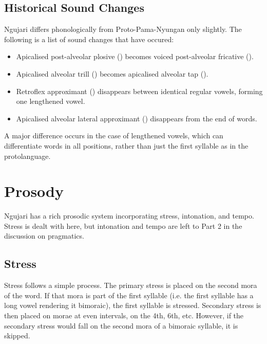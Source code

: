 %
%

\subsection{Historical Sound Changes}

Ngujari differs phonologically from Proto-Pama-Nyungan only slightly. The
following is a list of sound changes that have occured:

\begin{itemize}
\item Apicalised post-alveolar plosive () becomes
  voiced post-alveolar fricative ().
\item Apicalised alveolar trill (\textipa{\|]r}) becomes apicalised alveolar tap
  (\textipa{\|]R}).
\item Retroflex approximant (\textipa{\textturnrrtail}) disappears between
  identical regular vowels, forming one lengthened vowel.
\item Apicalised alveolar lateral approximant (\textipa{\|]l}) disappears from
  the end of words.
\end{itemize}

A major difference occurs in the case of lengthened vowels, which can
differentiate words in all positions, rather than just the first syllable as in
the protolanguage.

\section{Prosody}\label{prosody}

Ngujari has a rich prosodic system incorporating stress, intonation, and tempo.
Stress is dealt with here, but intonation and tempo are left to Part 2 in the
discussion on pragmatics.

\subsection{Stress}
Stress follows a simple process. The primary stress is placed on the second mora
of the word. If that mora is part of the first syllable (i.e. the first syllable
has a long vowel rendering it bimoraic), the first syllable is stressed.
Secondary stress is then placed on morae at even intervals, on the 4th, 6th,
etc. However, if the secondary stress would fall on the second mora of a
bimoraic syllable, it is skipped.
